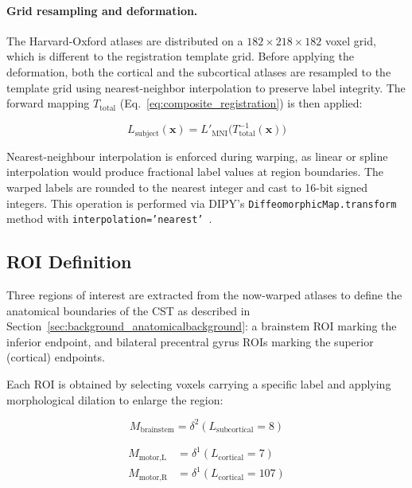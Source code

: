 \paragraph{Grid resampling and deformation.}

The Harvard-Oxford atlases are distributed on a $182 \times 218 \times 182$ voxel grid, which is different to the registration template grid. Before applying the deformation, both the cortical and the subcortical atlases are resampled to the template grid using nearest-neighbor interpolation to preserve label integrity. The forward mapping $T_{\text{total}}$ (Eq.~\ref{eq:composite_registration}) is then applied:

\begin{equation}
	L_{\text{subject}}(\mathbf{x}) = L'_{\text{MNI}}\!\bigl(T_{\text{total}}^{-1}(\mathbf{x})\bigr)
	\label{eq:atlas_warp}
\end{equation}

Nearest-neighbour interpolation is enforced during warping, as linear or spline interpolation would produce fractional label values at region boundaries. The warped labels are rounded to the nearest integer and cast to 16-bit signed integers. This operation is performed via DIPY's \texttt{DiffeomorphicMap.transform} method with \texttt{interpolation='nearest'}~\cite{garyfallidis_dipy_2014}.

\subsection{ROI Definition}
\label{subsec:methods_roidefinition}

Three regions of interest are extracted from the now-warped atlases to define the anatomical boundaries of the CST as described in Section~\ref{sec:background_anatomicalbackground}: a brainstem ROI marking the inferior endpoint, and bilateral precentral gyrus ROIs marking the superior (cortical) endpoints.

Each ROI is obtained by selecting voxels carrying a specific label and applying morphological dilation to enlarge the region:

\begin{equation}
	M_{\text{brainstem}} = \delta^{2}(L_{\text{subcortical}} = 8)
	\label{eq:brainstem_mask}
\end{equation}

\begin{equation}
	\begin{aligned}
		M_{\text{motor,L}} &= \delta^{1}(L_{\text{cortical}} = 7) \\[2pt]
		M_{\text{motor,R}} &= \delta^{1}(L_{\text{cortical}} = 107)
	\end{aligned}
	\label{eq:motor_masks}
\end{equation}

